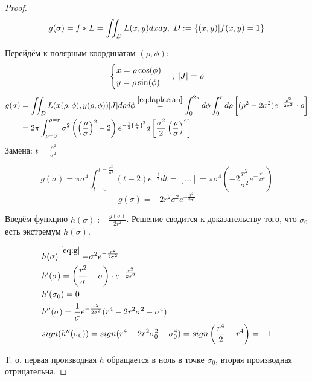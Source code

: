 \documentclass[a4paper,12pt]{article}
\begin{document}
\begin{proof}
\[ g(\sigma) = f*L = \iint_D L(x,y) dxdy, \thickspace D := \{(x, y) | f(x, y) = 1\} \\ \]

Перейдём к полярным координатам $ (\rho, \phi)$:
\[ \begin{cases}
    x = \rho \cos(\phi) \\
    y = \rho \sin(\phi) \\
\end{cases}, \thickspace |J| = \rho \]
\begin{align*}
    g(\sigma) & = \iint_D L(x(\rho, \phi), y(\rho, \phi)) |J| d\rho d\phi  \overset{\eqref{eq:laplacian}}= \int_0^{2 \pi} d\phi \int_0^r d\rho \left[ (\rho^2 - 2 \sigma^2) e^{-\frac{\rho^2}{2 \sigma^2}} \cdot \rho \right] \\
    & = 2 \pi \int_{\rho=0}^{\rho=r} \sigma^2 \left(\left(\frac{\rho}{\sigma}\right)^2 - 2 \right) e^{- \frac{1}{2} \left(\frac{\rho}{\sigma}\right)^2} d \left[ \frac{\sigma^2}{2} \left(\frac{\rho}{\sigma}\right)^2\right]
\end{align*}
Замена: $ t = \frac{\rho^2}{\sigma^2} $

\[g(\sigma) = \pi \sigma^4 \int_{t=0}^{t=\frac{r^2}{\sigma^2}} (t-2) e^{-\frac{t}{2}} dt = [...] = \pi \sigma^4 \left(-2 \frac{r^2}{\sigma^2} e^{-\frac{r^2}{2 \sigma^2}}\right) \]
\begin{equation}\label{eq:g}
    \boxed{ g(\sigma) = -2 r^2 \sigma^2 e^{-\frac{r^2}{2 \sigma^2}} }
\end{equation}

Введём функцию $ h(\sigma) := \frac{g(\sigma)}{2 r^2} $. Решение сводится к доказательству того, что $ \sigma_0 $ есть экстремум $ h(\sigma) $.

\begin{align*}
    & h(\sigma) \overset{\eqref{eq:g}}= -\sigma^2 e^{-\frac{r^2}{2 \sigma^2}} \\
    & h'(\sigma) = \left( \frac{r^2}{\sigma} - \sigma \right) \cdot e^{-\frac{r^2}{2 \sigma^2}} \\
    & h'(\sigma_0) = 0 \\
    & h''(\sigma) = \frac{1}{\sigma} e^{-\frac{r^2}{2 \sigma^2}} (r^4 - 2 r^2 \sigma^2 - \sigma^4) \\
    & sign(h''(\sigma_0)) = sign(r^4 - 2 r^2 \sigma_0^2 - \sigma_0^4) = sign \left(\frac{r^4}{2} - r^4 \right) = -1 \\
\end{align*}

Т. о. первая производная $h$ обращается в ноль в точке $\sigma_0$, вторая производная отрицательна.

\end{proof}
\end{document}
